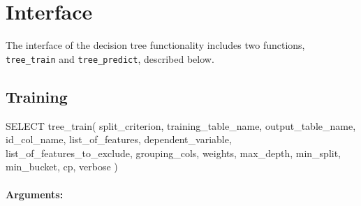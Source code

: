\section{Interface} %
\label{sec:interface}
The interface of the decision tree functionality includes two functions,
\texttt{tree\_train} and \texttt{tree\_predict}, described below.

\subsection{Training} %
\label{sub:training}
\begin{sql}
    SELECT tree_train(
            split_criterion,
            training_table_name,
            output_table_name,
            id_col_name,
            list_of_features,
            dependent_variable,
            list_of_features_to_exclude,
            grouping_cols,
            weights,
            max_depth,
            min_split,
            min_bucket,
            cp,
            verbose
    )
\end{sql}

\paragraph{Arguments:}

